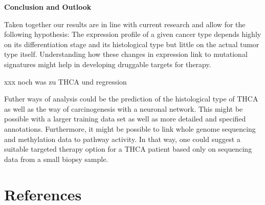 \documentclass[
  parskip,
  oneside]{scrreprt}
\begin{document}
\textbf{Conclusion and Outlook}

Taken together our results are in line with current research and allow
for the following hypothesis: The expression profile of a given cancer
type depends highly on its differentiation stage and its histological
type but little on the actual tumor type itself. Understanding how these
changes in expression link to mutational signatures might help in
developing druggable targets for therapy.

xxx noch was zu THCA und regression

Futher ways of analysis could be the prediction of the histological type
of THCA as well as the way of carcinogenesis with a neuronal network.
This might be possible with a larger training data set as well as more
detailed and specified annotations. Furthermore, it might be possible to
link whole genome sequencing and methylation data to pathway activity.
In that way, one could suggest a suitable targeted therapy option for a
THCA patient based only on sequencing data from a small biopsy sample.

\hypertarget{references}{%
\chapter{References}\label{references}}
\end{document}
